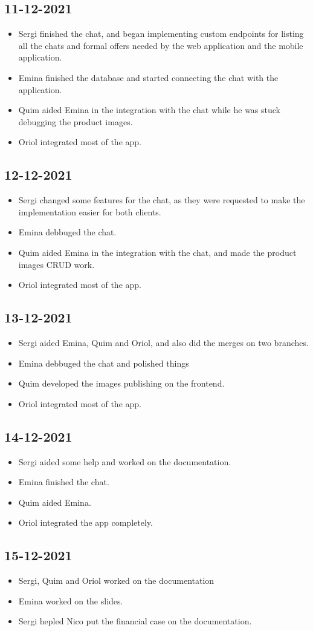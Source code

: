 \documentclass[./main.tex]{subfiles}
\begin{document}
\subsection{11-12-2021}
\begin{itemize}
	\item Sergi finished the chat, and began implementing custom endpoints for listing all the chats and formal offers needed by the web application and the mobile application.
	\item Emina finished the database and started connecting the chat with the application.
	\item Quim aided Emina in the integration with the chat while he was stuck debugging the product images.
	\item Oriol integrated most of the app.
\end{itemize}

\subsection{12-12-2021}
\begin{itemize}
	\item Sergi changed some features for the chat, as they were requested to make the implementation easier for both clients.
	\item Emina debbuged the chat.
	\item Quim aided Emina in the integration with the chat, and made the product images CRUD work.
	\item Oriol integrated most of the app.
\end{itemize}

\subsection{13-12-2021}
\begin{itemize}
	\item Sergi aided Emina, Quim and Oriol, and also did the merges on two branches.
	\item Emina debbuged the chat and polished things
	\item Quim developed the images publishing on the frontend.
	\item Oriol integrated most of the app.
\end{itemize}

\subsection{14-12-2021}
\begin{itemize}
	\item Sergi aided some help and worked on the documentation.
	\item Emina finished the chat.
	\item Quim aided Emina.
	\item Oriol integrated the app completely.
\end{itemize}


\subsection{15-12-2021}
\begin{itemize}
	\item Sergi, Quim and Oriol worked on the documentation
	\item Emina worked on the slides.
	\item Sergi hepled Nico put the financial case on the documentation.
\end{itemize}
\end{document}
